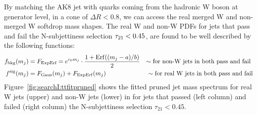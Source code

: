 By matching the AK8 jet with quarks coming from the hadronic W boson at generator level, in a cone of $\Delta R < 0.8$, we can access the real merged W and non-merged W softdrop mass shapes.
The real W and non-W PDFs for jets that pass and fail the N-subjettiness selection $\tau_{21} < 0.45$, are found to be well described by the following functions:
\begin{align*} 
f_{\rm bkg}(m_{j}) &= F_{\textrm{ExpErf}} = e^{c_0m_{j}} \cdot \frac{1 + {\rm Erf}((m_{j}-a)/b)}{2}  &\sim\textrm{for non-\PW jets in both pass and fail }\\
f^{\rm sig}(m_{j}) &= F_{\rm Gaus}(m_{j}) + F_{\rm ExpErf}(m_{j})                                    &\sim\textrm{for real \PW jets in both pass and fail}
\end{align*}
Figure~\ref{fig:searchI:ttfitpruned} shows the fitted pruned jet mass spectrum for real W jets (upper) and non-W jets (lower) in \ttbar for jets that passed (left column) and failed (right column) the N-subjettiness selection $\tau_{21}<0.45$.

